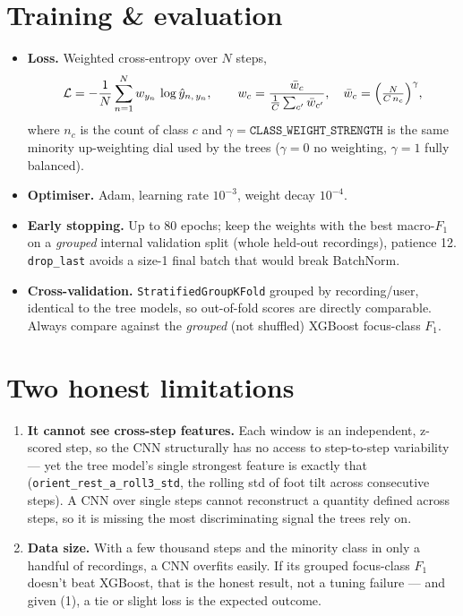 \documentclass[11pt]{article}
\newcommand{\code}[1]{\texttt{#1}}
\begin{document}
\section{Training \& evaluation}
\begin{itemize}
  \item \textbf{Loss.} Weighted cross-entropy over $N$ steps,
  \begin{equation}
  \mathcal L=-\frac{1}{N}\sum_{n=1}^{N} w_{y_n}\,\log \hat y_{n,\,y_n},\qquad
  w_c=\frac{\bar w_c}{\frac1{C}\sum_{c'}\bar w_{c'}},\quad
  \bar w_c=\Bigl(\tfrac{N}{C\,n_c}\Bigr)^{\gamma},
  \end{equation}
  where $n_c$ is the count of class $c$ and $\gamma=\code{CLASS_WEIGHT_STRENGTH}$ is the same
  minority up-weighting dial used by the trees ($\gamma{=}0$ no weighting, $\gamma{=}1$ fully
  balanced).
  \item \textbf{Optimiser.} Adam, learning rate $10^{-3}$, weight decay $10^{-4}$.
  \item \textbf{Early stopping.} Up to 80 epochs; keep the weights with the best macro-$F_1$ on a
  \emph{grouped} internal validation split (whole held-out recordings), patience 12. \code{drop_last}
  avoids a size-1 final batch that would break BatchNorm.
  \item \textbf{Cross-validation.} \code{StratifiedGroupKFold} grouped by recording/user, identical
  to the tree models, so out-of-fold scores are directly comparable. Always compare against the
  \emph{grouped} (not shuffled) XGBoost focus-class $F_1$.
\end{itemize}

\section{Two honest limitations}
\begin{enumerate}
  \item \textbf{It cannot see cross-step features.} Each window is an independent, z-scored step, so
  the CNN structurally has no access to step-to-step variability --- yet the tree model's single
  strongest feature is exactly that (\code{orient_rest_a_roll3_std}, the rolling std of foot tilt
  across consecutive steps). A CNN over single steps cannot reconstruct a quantity defined across
  steps, so it is missing the most discriminating signal the trees rely on.
  \item \textbf{Data size.} With a few thousand steps and the minority class in only a handful of
  recordings, a CNN overfits easily. If its grouped focus-class $F_1$ doesn't beat XGBoost, that is
  the honest result, not a tuning failure --- and given (1), a tie or slight loss is the expected
  outcome.
\end{enumerate}
\end{document}

